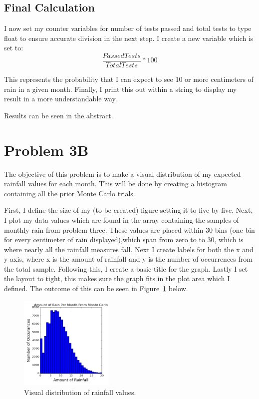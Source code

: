 \documentclass[twocolumn]{revtex4}
\begin{document}
\subsection{Final Calculation}
I now set my counter variables for number of tests passed and total tests to type float to ensure accurate division in the next step. I create a new variable which is set to:
$$\frac{PassedTests}{TotalTests} * 100 $$ %

This represents the probability that I can expect to see 10 or more centimeters of rain in a given month. Finally, I print this out within a string to display my result in a more understandable way.

\begin{it}Results can be seen in the abstract.
\end{it}
\section{Problem 3B}
The objective of this problem is to make a visual distribution of my expected rainfall values for each month. This will be done by creating a histogram containing all the prior Monte Carlo trials.

First, I define the size of my (to be created) figure setting it to five by five. Next, I plot my data values which are found in the array containing the samples of monthly rain from problem three. These values are placed within 30 bins (one bin for every centimeter of rain displayed),which span from zero to to 30, which is where nearly all the rainfall measures fall. Next I create labels for both the x and y axis, where x is the amount of rainfall and y is the number of occurrences from the total sample. Following this, I create a basic title for the graph. Lastly I set the layout to tight, this makes sure the graph fits in the plot area which I defined. The outcome of this can be seen in Figure~\ref{rain} below.

\begin{figure}[h] %
\centering
\includegraphics[width=0.40\textwidth]{monte_carlo_graph_mike_adamski.png}
\caption{Visual distribution of rainfall values.\label{rain}}
\end{figure}
\end{document}
